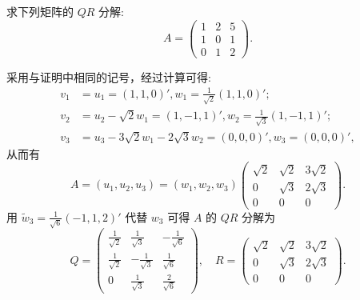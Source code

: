 \documentclass[../../main.tex]{subfiles}
\begin{document}
\begin{example}
求下列矩阵的 $QR$ 分解:
\[
A = \begin{pmatrix}
1 & 2 & 5 \\
1 & 0 & 1 \\
0 & 1 & 2
\end{pmatrix}.
\]
\end{example}
\begin{solution}
采用与证明中相同的记号，经过计算可得:
\begin{align*}
v_1&=u_1=(1,1,0)' ,w_1=\frac{1}{\sqrt{2}}(1,1,0)' ;
\\
v_2&=u_2-\sqrt{2}w_1=(1,-1,1)' ,w_2=\frac{1}{\sqrt{3}}(1,-1,1)' ;
\\
v_3&=u_3-3\sqrt{2}w_1-2\sqrt{3}w_2=(0,0,0)' ,w_3=(0,0,0)',
\end{align*}
从而有
\[
A = (u_1,u_2,u_3) = (w_1,w_2,w_3)\begin{pmatrix}
\sqrt{2} & \sqrt{2} & 3\sqrt{2} \\
0 & \sqrt{3} & 2\sqrt{3} \\
0 & 0 & 0
\end{pmatrix}.
\]
用 $\widetilde{w}_3 = \frac{1}{\sqrt{6}}(-1,1,2)'$ 代替 $w_3$ 可得 $A$ 的 $QR$ 分解为
\[
Q = \begin{pmatrix}
\frac{1}{\sqrt{2}} & \frac{1}{\sqrt{3}} & -\frac{1}{\sqrt{6}} \\
\frac{1}{\sqrt{2}} & -\frac{1}{\sqrt{3}} & \frac{1}{\sqrt{6}} \\
0 & \frac{1}{\sqrt{3}} & \frac{2}{\sqrt{6}}
\end{pmatrix}, \quad
R = \begin{pmatrix}
\sqrt{2} & \sqrt{2} & 3\sqrt{2} \\
0 & \sqrt{3} & 2\sqrt{3} \\
0 & 0 & 0
\end{pmatrix}.
\] 

\end{solution}
\end{document}
